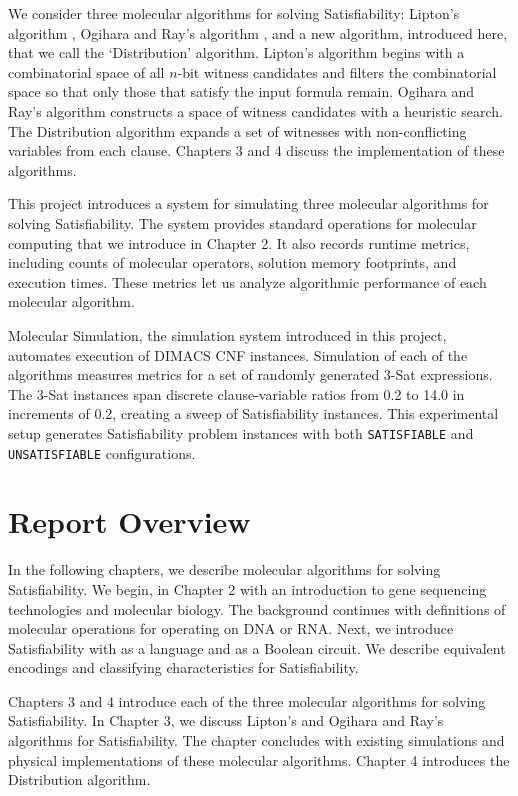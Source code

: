We consider three molecular algorithms for solving {\sc Satisfiability}: Lipton's algorithm \cite{Lipton95usingdna}, Ogihara and Ray's algorithm \cite{Ogihara:1996:BFS:898228, Ogihara97dna-basedparallel}, and a new algorithm, introduced here, that we call the `Distribution' algorithm.  Lipton's algorithm begins with a combinatorial space of all $n$-bit witness candidates and filters the combinatorial space so that only those that satisfy the input formula remain.  Ogihara and Ray's algorithm constructs a space of witness candidates with a heuristic search.  The Distribution algorithm expands a set of witnesses with non-conflicting variables from each clause.  Chapters 3 and 4 discuss the implementation of these algorithms.

This project introduces a system for simulating three molecular algorithms for solving {\sc Satisfiability}.  The system provides standard operations for molecular computing that we introduce in Chapter 2.  It also records runtime metrics, including counts of molecular operators, solution memory footprints, and execution times.  These metrics let us analyze algorithmic performance of each molecular algorithm.

Molecular Simulation, the simulation system introduced in this project, automates execution of DIMACS CNF instances.  Simulation of each of the algorithms measures metrics for a set of randomly generated $3$-{\sc Sat} expressions.  The $3$-{\sc Sat} instances span discrete clause-variable ratios from 0.2 to 14.0 in increments of 0.2, creating a sweep of {\sc Satisfiability} instances.  This experimental setup generates {\sc Satisfiability} problem instances with both \texttt{SATISFIABLE} and \texttt{UNSATISFIABLE} configurations.

\section{Report Overview}

In the following chapters, we describe molecular algorithms for solving {\sc Satisfiability}.  We begin, in Chapter 2 with an introduction to gene sequencing technologies and molecular biology.  The background continues with definitions of molecular operations for operating on DNA or RNA.  Next, we introduce {\sc Satisfiability} with as a language and as a Boolean circuit.  We describe equivalent encodings and classifying characteristics for {\sc Satisfiability}.

Chapters 3 and 4 introduce each of the three molecular algorithms for solving {\sc Satisfiability}.  In Chapter 3, we discuss Lipton's \cite{Lipton95usingdna, dnaComputingModels2008} and Ogihara and Ray's \cite{Ogihara:1996:BFS:898228, Ogihara97dna-basedparallel, dnaBasedImplemetation_Yoshida2000} algorithms for {\sc Satisfiability}.  The chapter concludes with existing simulations and physical implementations of these molecular algorithms.  Chapter 4 introduces the Distribution algorithm.

